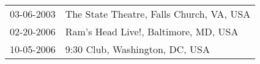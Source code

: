 \begin{supertabular}{ll}
 03-06-2003 &  The State Theatre, Falls Church, VA, USA \\
 02-20-2006 &      Ram's Head Live!, Baltimore, MD, USA \\
 10-05-2006 &            9:30 Club, Washington, DC, USA \\
\end{supertabular}
